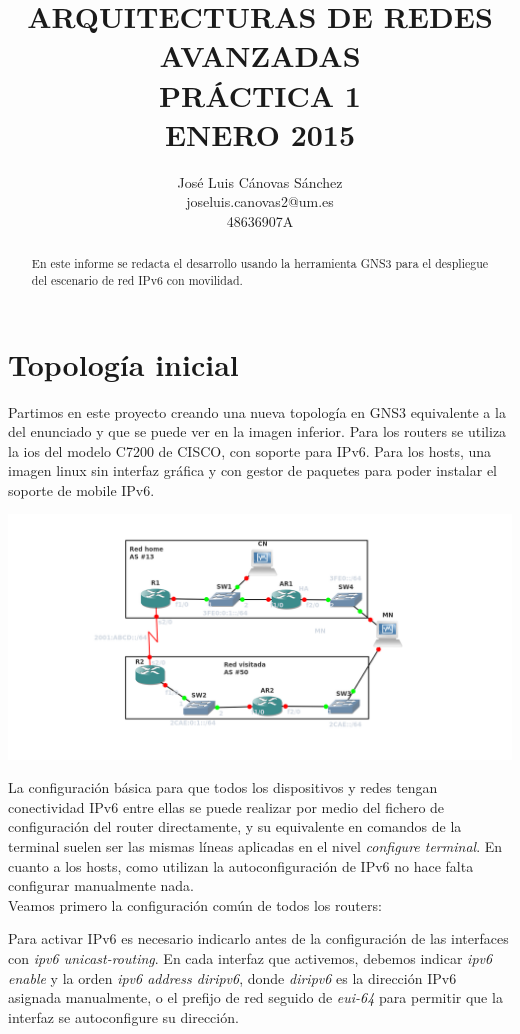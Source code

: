 \documentclass{article}
\author{José Luis Cánovas Sánchez\\joseluis.canovas2@um.es\\48636907A}
\title{ARQUITECTURAS DE REDES AVANZADAS\\PRÁCTICA 1\\ ENERO 2015}
\date{}
\begin{document}
\maketitle

\begin{abstract}
	En este informe se redacta el desarrollo usando la herramienta GNS3 para el despliegue del escenario de red IPv6 con movilidad.
\end{abstract}

\tableofcontents
\section{Topología inicial}
Partimos en este proyecto creando una nueva topología en GNS3 equivalente a la del enunciado y que se puede ver en la imagen inferior. Para los routers se utiliza la ios del modelo C7200 de CISCO, con soporte para IPv6. Para los hosts, una imagen linux sin interfaz gráfica y con gestor de paquetes para poder instalar el soporte de mobile IPv6.\par

\begin{center}
	\includegraphics[scale=0.5]{images/topologyInic.png}
\end{center}

La configuración básica para que todos los dispositivos y redes tengan conectividad IPv6 entre ellas se puede realizar por medio del fichero de configuración del router directamente, y su equivalente en comandos de la terminal suelen ser las mismas líneas aplicadas en el nivel \textit{configure terminal}. En cuanto a los hosts, como utilizan la autoconfiguración de IPv6 no hace falta configurar manualmente nada.
\\

Veamos primero la configuración común de todos los routers:

Para activar IPv6 es necesario indicarlo antes de la configuración de las interfaces con \textit{ipv6 unicast-routing}. En cada interfaz que activemos, debemos indicar \textit{ipv6 enable} y la orden \textit{ipv6 address diripv6}, donde \textit{diripv6} es la dirección IPv6 asignada manualmente, o el prefijo de red seguido de \textit{eui-64} para permitir que la interfaz se autoconfigure su dirección.
\end{document}
